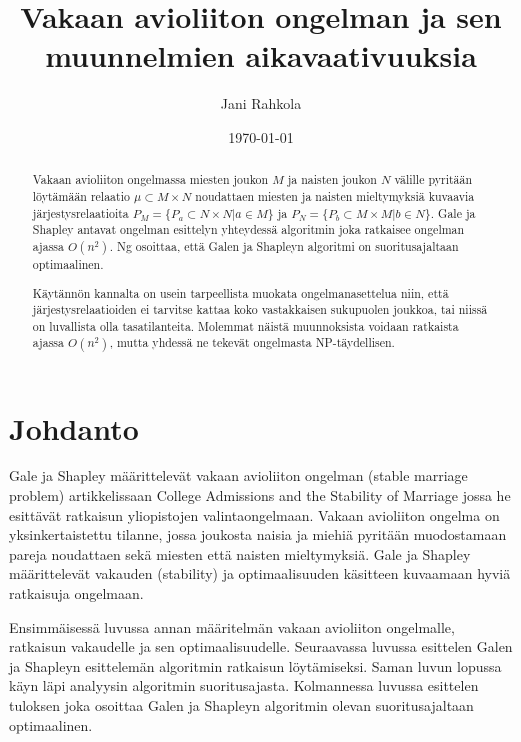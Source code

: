 \documentclass[gradu, twoside]{tktltiki}
\begin{document}
\title{Vakaan avioliiton ongelman ja sen muunnelmien aikavaativuuksia}
\author{Jani Rahkola}
\date{\today}
\level{}

\maketitle

\doublespacing

\subject{Tietojenkäsittelytiede}

\begin{abstract}
  Vakaan avioliiton ongelmassa miesten joukon $M$ ja naisten joukon
  $N$ välille pyritään löytämään relaatio $\mu \subset M \times N$
  noudattaen miesten ja naisten mieltymyksiä kuvaavia
  järjestysrelaatioita $P_M = \{P_a \subset N \times N | a \in M\}$ ja
  $P_N = \{P_b \subset M \times M | b \in N\}$. Gale ja Shapley
  antavat ongelman esittelyn yhteydessä algoritmin joka ratkaisee
  ongelman ajassa $O(n^2)$. Ng osoittaa, että Galen ja Shapleyn
  algoritmi on suoritusajaltaan optimaalinen.

  Käytännön kannalta on usein tarpeellista muokata ongelmanasettelua
  niin, että järjestysrelaatioiden ei tarvitse kattaa koko vastakkaisen
  sukupuolen joukkoa, tai niissä on luvallista olla tasatilanteita.
  Molemmat näistä muunnoksista voidaan ratkaista ajassa $O(n^2)$, mutta
  yhdessä ne tekevät ongelmasta NP-täydellisen.
\end{abstract}

\mytableofcontents

\section{Johdanto}

Gale ja Shapley määrittelevät vakaan avioliiton ongelman (stable
marriage problem) artikkelissaan College Admissions and the Stability
of Marriage \cite{galeshapley62} jossa he esittävät ratkaisun
yliopistojen valintaongelmaan. Vakaan avioliiton ongelma on
yksinkertaistettu tilanne, jossa joukosta naisia ja miehiä pyritään
muodostamaan pareja noudattaen sekä miesten että naisten mieltymyksiä.
Gale ja Shapley määrittelevät vakauden (stability) ja optimaalisuuden
käsitteen kuvaamaan hyviä ratkaisuja ongelmaan.

Ensimmäisessä luvussa annan määritelmän vakaan avioliiton ongelmalle,
ratkaisun vakaudelle ja sen optimaalisuudelle. Seuraavassa luvussa
esittelen Galen ja Shapleyn esittelemän algoritmin ratkaisun
löytämiseksi. Saman luvun lopussa käyn läpi analyysin algoritmin
suoritusajasta. Kolmannessa luvussa esittelen tuloksen joka osoittaa
Galen ja Shapleyn algoritmin olevan suoritusajaltaan optimaalinen.
\end{document}
